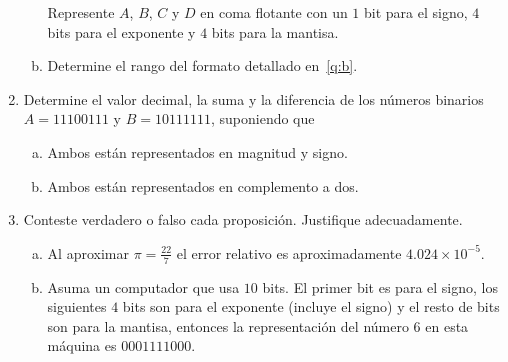 \begin{frame}
\begin{enumerate}
\begin{enumerate}[a)]
                        Represente $A$, $B$, $C$ y $D$ en coma
                        flotante con un $1$ bit para el signo, $4$
                        bits para el exponente y $4$ bits para la
                        mantisa.

                  \item

                        Determine el rango del formato detallado
                        en~\eqref{q:b}.
              \end{enumerate}

        \item

              Determine el valor decimal, la suma y la diferencia de
              los números binarios $A=11100111$ y $B=10111111$,
              suponiendo que

              \begin{multicols}{2}
                  \begin{enumerate}[a)]
                      \item

                            Ambos están representados en magnitud y
                            signo.

                      \item

                            Ambos están representados en complemento
                            a dos.
                  \end{enumerate}
              \end{multicols}

        \item

              Conteste verdadero o falso cada proposición.
              Justifique adecuadamente.

              \begin{enumerate}[a)]
                  \item

                        Al aproximar $\pi=\frac{22}{7}$ el error
                        relativo es aproximadamente
                        $4.024\times 10^{-5}$.

                  \item

                        Asuma un computador que usa $10$ bits.
                        El primer bit es para el signo, los
                        siguientes $4$ bits son para el exponente
                        (incluye el signo) y el resto de bits son
                        para la mantisa, entonces la representación
                        del número $6$ en esta máquina es
                        $0001111000$.


\end{enumerate}
\end{enumerate}
\end{frame}
